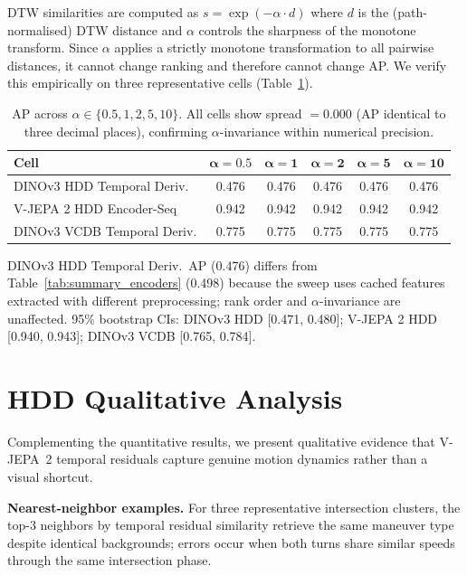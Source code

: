 \documentclass{article}
\theoremstyle{remark}
\begin{document}
DTW similarities are computed as $s = \exp(-\alpha \cdot d)$ where $d$ is the (path-normalised) DTW distance and $\alpha$ controls the sharpness of the monotone transform. Since $\alpha$ applies a strictly monotone transformation to all pairwise distances, it cannot change ranking and therefore cannot change AP. We verify this empirically on three representative cells (Table~\ref{tab:alpha_sweep}).

\begin{table}[h]
\centering
\caption{AP across $\alpha \in \{0.5, 1, 2, 5, 10\}$. All cells show spread $= 0.000$ (AP identical to three decimal places), confirming $\alpha$-invariance within numerical precision.}
\label{tab:alpha_sweep}
\begin{tabular}{lccccc}
\toprule
\textbf{Cell} & $\boldsymbol{\alpha\!=\!0.5}$ & $\boldsymbol{\alpha\!=\!1}$ & $\boldsymbol{\alpha\!=\!2}$ & $\boldsymbol{\alpha\!=\!5}$ & $\boldsymbol{\alpha\!=\!10}$ \\
\midrule
DINOv3 HDD Temporal Deriv.   & 0.476 & 0.476 & 0.476 & 0.476 & 0.476 \\
V-JEPA 2 HDD Encoder-Seq     & 0.942 & 0.942 & 0.942 & 0.942 & 0.942 \\
DINOv3 VCDB Temporal Deriv.  & 0.775 & 0.775 & 0.775 & 0.775 & 0.775 \\
\bottomrule
\end{tabular}
\begin{flushleft}
\small DINOv3 HDD Temporal Deriv.\ AP (0.476) differs from Table~\ref{tab:summary_encoders} (0.498) because the sweep uses cached features extracted with different preprocessing; rank order and $\alpha$-invariance are unaffected. 95\% bootstrap CIs: DINOv3 HDD [0.471, 0.480]; V-JEPA 2 HDD [0.940, 0.943]; DINOv3 VCDB [0.765, 0.784].
\end{flushleft}
\end{table}

\section{HDD Qualitative Analysis}
\label{sec:hdd_qualitative}

Complementing the quantitative results, we present qualitative evidence that V-JEPA~2 temporal residuals capture genuine motion dynamics rather than a visual shortcut.

\textbf{Nearest-neighbor examples.} For three representative intersection clusters, the top-3 neighbors by temporal residual similarity retrieve the same maneuver type despite identical backgrounds; errors occur when both turns share similar speeds through the same intersection phase.
\end{document}
